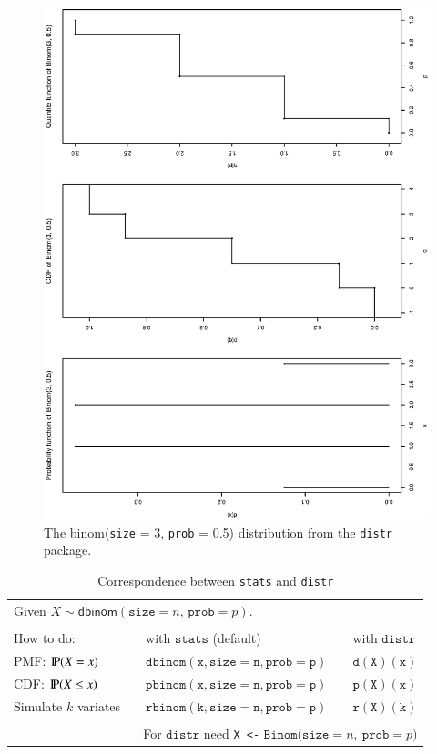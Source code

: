 \documentclass[captions=tableheading]{scrbook}
\begin{document}
\begin{figure}[th]
  \includegraphics[angle=270, totalheight=4in]{ps/binom-plot-distr.ps}
  \caption[The \textsf{binom}(\texttt{size} = 3, \texttt{prob} = 0.5) distribution from the \texttt{distr} package]{\small The \textsf{binom}(\texttt{size} = 3, \texttt{prob} = 0.5) distribution from the \texttt{distr} package.}
  \label{fig:binom-plot-distr}
\end{figure}

\begin{table}
\begin{tabular}{lllll}
\multicolumn{5}{l}{Given \(X\sim\mathsf{dbinom}(\mathtt{size}=n,\,\mathtt{prob}=p)\).}\tabularnewline
 &  &  &  & \tabularnewline
How to do: &  & with \(\mathtt{stats}\) (default)  &  & with \(\mathtt{distr}\)\tabularnewline
\hline
PMF: \(\P(X=x)\) &  & \(\mathtt{dbinom(x,size=n,prob=p)}\) &  & \(\mathtt{d(X)(x)}\)\tabularnewline
CDF: \(\P(X\leq x)\) &  & \(\mathtt{pbinom(x,size=n,prob=p)}\) &  & \(\mathtt{p(X)(x)}\)\tabularnewline
Simulate \(k\) variates &  & \(\mathtt{rbinom(k,size=n,prob=p)}\) &  & \(\mathtt{r(X)(k)}\)\tabularnewline
\hline
 &  &  &  & \tabularnewline
\multicolumn{5}{r}{For \(\mathtt{distr}\) need \texttt{X <-} \(\mathtt{Binom(size=}n\mathtt{,\ prob=}p\mathtt{)}\)}\tabularnewline
\end{tabular}
\caption{Correspondence between \texttt{stats} and \texttt{distr}}
\end{table}
\end{document}
